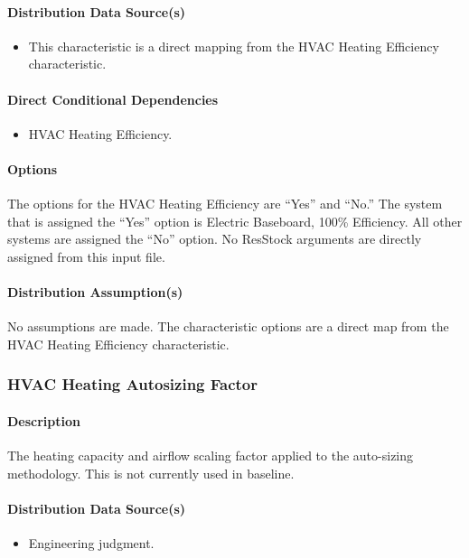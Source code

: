 \paragraph{Distribution Data Source(s)}
\begin{itemize}
    \item This characteristic is a direct mapping from the HVAC Heating Efficiency characteristic.
\end{itemize}



\paragraph{Direct Conditional Dependencies}
\begin{itemize}
    \item HVAC Heating Efficiency.
\end{itemize}

\paragraph{Options}
The options for the HVAC Heating Efficiency are ``Yes'' and ``No.'' The system that is assigned the ``Yes'' option is Electric Baseboard, 100\% Efficiency. All other systems are assigned the ``No'' option. No ResStock arguments are directly assigned from this input file.

\paragraph{Distribution Assumption(s)}
No assumptions are made. The characteristic options are a direct map from the HVAC Heating Efficiency characteristic.

\subsubsection{HVAC Heating Autosizing Factor}
\paragraph{Description}
The heating capacity and airflow scaling factor applied to the auto-sizing methodology. This is not currently used in baseline.  

\paragraph{Distribution Data Source(s)}
\begin{itemize}
    \item Engineering judgment.
\end{itemize}

